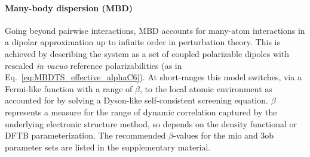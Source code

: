\documentclass{revtex4-1}
\begin{document}
\paragraph{Many-body dispersion (MBD)}
Going beyond pairwise interactions, MBD\cite{Tkatchenko2012,Ambrosetti2014}
accounts for many-atom interactions in a dipolar approximation up to infinite
order in perturbation theory. This is achieved by describing the system as a set
of coupled polarizable dipoles\cite{Tkatchenko2012} with rescaled \textit{in vacuo}
reference polarizabilities (as in Eq.~\eqref{eq:MBDTS_effective_alphaC6}). At
short-ranges this model switches, via a Fermi-like function with a range of
$\beta$, to the local atomic environment as accounted for by solving a
Dyson-like self-consistent screening equation.\cite{Ambrosetti2014} $\beta$
represents a measure for the range of dynamic correlation captured by the
underlying electronic structure method, so depends on the density functional or
DFTB parameterization. The recommended $\beta$-values for the mio and 3ob parameter sets are
listed in the supplementary material.
\end{document}
